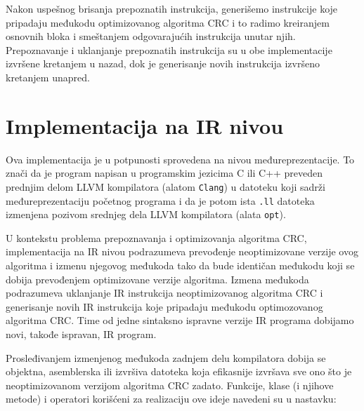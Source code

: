 \documentclass[12pt,oneside]{memoir}
\begin{document}
Nakon uspešnog brisanja prepoznatih instrukcija, generišemo instrukcije koje pripadaju međukodu optimizovanog algoritma CRC i to radimo kreiranjem osnovnih bloka i smeštanjem odgovarajućih instrukcija unutar njih. Prepoznavanje i uklanjanje prepoznatih instrukcija su u obe implementacije izvršene kretanjem u nazad, dok je generisanje novih instrukcija izvršeno kretanjem unapred. 

\section{Implementacija na IR nivou}

Ova implementacija je u potpunosti sprovedena na nivou međureprezentacije. To znači da je 
program napisan u programskim jezicima C ili C++ preveden prednjim delom LLVM 
kompilatora (alatom \texttt{Clang}) u datoteku koji sadrži 
međureprezentaciju početnog programa i da je potom ista \texttt{.ll} datoteka izmenjena pozivom srednjeg dela LLVM kompilatora (alata \texttt{opt}). 

U kontekstu problema prepoznavanja i optimizovanja algoritma CRC, implementacija na IR nivou podrazumeva prevođenje neoptimizovane verzije ovog algoritma i izmenu njegovog međukoda tako da bude identičan međukodu koji se dobija prevođenjem optimizovane verzije algoritma. Izmena međukoda podrazumeva uklanjanje IR instrukcija neoptimizovanog algoritma CRC i generisanje novih IR instrukcija koje pripadaju međukodu
optimozovanog algoritma CRC. Time od jedne sintaksno ispravne verzije IR programa dobijamo novi, takođe ispravan, IR program. 

Prosleđivanjem izmenjenog međukoda zadnjem delu kompilatora dobija se objektna, asemblerska ili izvršiva datoteka koja efikasnije izvršava sve ono što je neoptimizovanom verzijom algoritma CRC zadato. Funkcije, klase (i njihove metode) i operatori korišćeni za realizaciju ove ideje navedeni su u nastavku:
\end{document}
